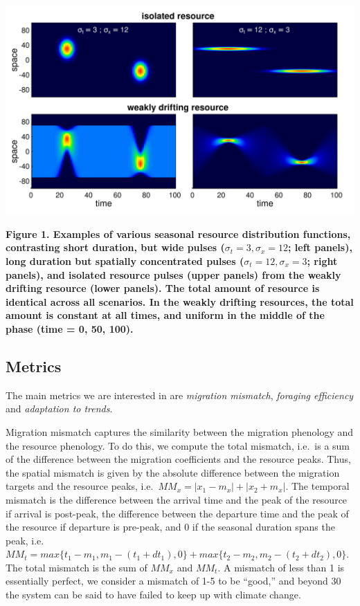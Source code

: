 \documentclass[12pt]{article}
\begin{document}
\includegraphics{figures/ResourceExamples.png}

\textbf{Figure 1. Examples of various seasonal resource distribution
functions, contrasting short duration, but wide pulses
(\(\sigma_t = 3, \sigma_x = 12\); left panels), long duration but
spatially concentrated pulses (\(\sigma_t = 12, \sigma_x = 3\); right
panels), and isolated resource pulses (upper panels) from the weakly
drifting resource (lower panels). The total amount of resource is
identical across all scenarios. In the weakly drifting resources, the
total amount is constant at all times, and uniform in the middle of the
phase (time = 0, 50, 100).}

\hypertarget{metrics}{%
\subsection{Metrics}\label{metrics}}

The main metrics we are interested in are \emph{migration mismatch},
\emph{foraging efficiency} and \emph{adaptation to trends}.

Migration mismatch captures the similarity between the migration
phenology and the resource phenology. To do this, we compute the total
mismatch, i.e.~is a sum of the difference between the migration
coefficients and the resource peaks. Thus, the spatial mismatch is given
by the absolute difference between the migration targets and the
resource peaks, i.e.~\(MM_x = |x_1 - m_x| + |x_2 + m_x|\). The temporal
mismatch is the difference between the arrival time and the peak of the
resource if arrival is post-peak, the difference between the departure
time and the peak of the resource if departure is pre-peak, and 0 if the
seasonal duration spans the peak,
i.e.~\(MM_t = max\{t_1 - m_1, m_1 - (t_1 + dt_1), 0\} + max\{t_2 - m_2, m_2 - (t_2 + dt_2), 0\}\).
The total mismatch is the sum of \(MM_x\) and \(MM_t\). A mismatch of
less than 1 is essentially perfect, we consider a mismatch of 1-5 to be
``good,'' and beyond 30 the system can be said to have failed to keep up
with climate change.
\end{document}
